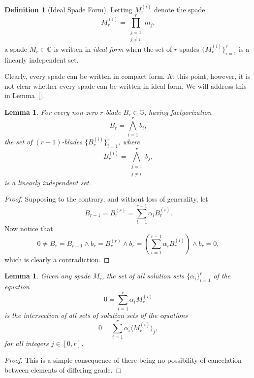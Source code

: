 \documentclass{birkjour}
\newtheorem{lem}[thm]{Lemma}
\theoremstyle{definition}
\newtheorem{defn}[thm]{Definition}
\theoremstyle{remark}
\numberwithin{equation}{section}
\newcommand{\G}{\mathbb{G}}
\begin{document}
\begin{defn}[Ideal Spade Form]
Letting $M_r^{(i)}$ denote the spade
\begin{equation*}
M_r^{(i)}=\prod_{\substack{j=1\\j\neq i}}^r m_j,
\end{equation*}
a spade $M_r\in\G$ is written in \emph{ideal form} when the set of $r$ spades $\{M_r^{(i)}\}_{i=1}^r$
is a linearly independent set.
\end{defn}

Clearly, every spade can be written in compact form.
At this point, however, it is not clear whether every spade can be written in ideal form.
We will address this in Lemma~\ref{}.

\begin{lem}\label{lem_lin_indep_blades}
For every non-zero $r$-blade $B_r\in\G$, having factgorization
\begin{equation*}
B_r = \bigwedge_{i=1}^r b_i,
\end{equation*}
the set of $(r-1)$-blades $\{B_r^{(i)}\}_{i=1}^r$, where
\begin{equation*}
B_r^{(i)}=\bigwedge_{\substack{j=1\\j\neq i}}^r b_j,
\end{equation*}
is a linearly independent set.
\end{lem}
\begin{proof}
Supposing to the contrary, and without loss of generality, let
\begin{equation*}
B_{r-1} = B_r^{(r)} = \sum_{i=1}^{r-1}\alpha_i B_r^{(i)}.
\end{equation*}
Now notice that
\begin{equation*}
0\neq B_r = B_{r-1}\wedge b_r = B_r^{(r)}\wedge b_r = \left(\sum_{i=1}^{r-1}\alpha_i B_r^{(i)}\right)\wedge b_r = 0,
\end{equation*}
which is clearly a contradiction.
\end{proof}

\begin{lem}\label{lem_solution_intersection}
Given any spade $M_r$, the set of all solution sets $\{\alpha_i\}_{i=1}^r$ of the equation
\begin{equation*}
0 = \sum_{i=1}^r\alpha_i M_r^{(i)}
\end{equation*}
is the intersection of all sets of solution sets of the equations
\begin{equation*}
0 = \sum_{i=1}^r\alpha_i\langle M_r^{(i)}\rangle_j,
\end{equation*}
for all integers $j\in[0,r]$.
\end{lem}
\begin{proof}
This is a simple consequence of there being no possibility of cancelation between elements of differing grade.
\end{proof}
\end{document}
